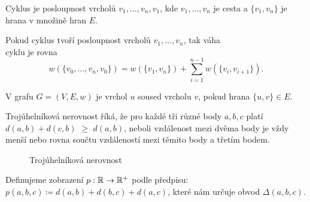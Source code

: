 \begin{definition}[Cyklus]
  \label{definice:cyklus}
  Cyklus je posloupnost vrcholů $v_1,\ldots,v_n,v_1$, kde $v_1,\ldots,v_n$ je cesta a  $\{v_1,v_n\}$ je hrana v množině hran $E$.
\end{definition}

\begin{definition}
  \label{definice:vaha_cyklu}
  Pokud cyklus tvoří posloupnost vrcholů $v_1, \ldots, v_n$, tak váha \\cyklu je rovna \[ w(\{v_0,\dots ,v_n, v_0\}) = w(\{v_1, v_n\}) + \sum_{i=1}^{n-1}w(\{v_i, v_{i+1}\}). \]
\end{definition}

\begin{definition}[Soused]
  \label{definice:soused}
  V grafu $G = (V, E, w)$ je vrchol $u$ soused vrcholu $v$, pokud hrana $\{u, v\} \in E$.
\end{definition}

\begin{definition}
  \label{definice:trojuhelnikova_nerovnost}
  Trojúhelníková nerovnost říká, že pro kaž\-dé tři různé body $a, b, c$ platí \textcolor{myblue}{$d(a, b)+d(c, b)$} $\geq$ \textcolor{myred}{$d(a,b)$}, neboli vzdálenost mezi dvěma body je vždy menší nebo rovna součtu vzdáleností mezi těmito body a třetím bodem.

  \begin{figure}[h]
    \centering
    \caption{Trojúhelníková nerovnost}
  \end{figure}
\end{definition}

\begin{definition}
  \label{definice:obvod_troj}
  Definujeme zobrazení $p: \mathbb{R}\rightarrow \mathbb{R}^+$ podle předpisu: $p(a, b, c) \coloneqq d(a, b) + d(b, c) + d(a, c)$, které nám určuje obvod $\Delta(a,b,c)$.
\end{definition}

